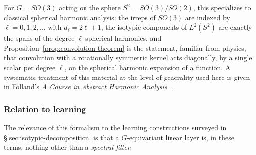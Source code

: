 \documentclass[mathematics,review,submit,moreauthors]{Definitions/mdpi}
\begin{document}
For $G = SO(3)$ acting on the sphere $S^2 = SO(3)/SO(2)$, this specializes
to classical spherical harmonic analysis: the irreps of $SO(3)$ are indexed
by $\ell = 0,1,2,\dots$ with $d_\ell = 2\ell+1$, the isotypic components of
$L^2(S^2)$ are exactly the spans of the degree-$\ell$ spherical harmonics,
and Proposition~\ref{prop:convolution-theorem} is the statement, familiar
from physics, that convolution with a rotationally symmetric kernel acts
diagonally, by a single scalar per degree $\ell$, on the spherical harmonic
expansion of a function. A systematic treatment of this material at the
level of generality used here is given in Folland's
\emph{A Course in Abstract Harmonic Analysis}~\cite{folland2016}.

\subsubsection{Relation to learning}
\label{subsubsec:harmonic-analysis-learning}

The relevance of this formalism to the learning constructions surveyed in
\S\ref{sec:isotypic-decomposition} is that a $G$-equivariant linear
layer is, in these terms, nothing other than a \emph{spectral filter}.
\end{document}
